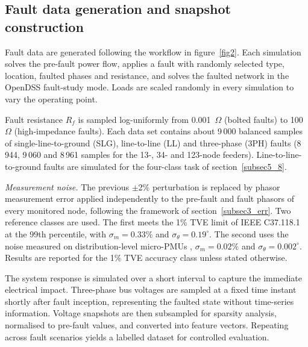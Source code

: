 \documentclass[11pt]{article}
\newenvironment{nw}{}{}
\begin{document}
\subsection{Fault data generation and snapshot construction}\label{subsec2_2}

\begin{nw}
Fault data are generated following the workflow in figure~\ref{fig2}. Each simulation solves the pre-fault power flow, applies a fault with randomly selected type, location, faulted phases and resistance, and solves the faulted network in the OpenDSS fault-study mode. Loads are scaled randomly in every simulation to vary the operating point.

Fault resistance $R_f$ is sampled log-uniformly from 0.001~$\Omega$ (bolted faults) to 100~$\Omega$ (high-impedance faults). Each data set contains about 9\,000 balanced samples of single-line-to-ground (SLG), line-to-line (LL) and three-phase (3PH) faults (8\,944, 9\,060 and 8\,961 samples for the 13-, 34- and 123-node feeders). Line-to-line-to-ground faults are simulated for the four-class task of section~\ref{subsec5_8}.
\end{nw}

\begin{nw}
\textit{Measurement noise.} The previous $\pm$2\% perturbation is replaced by phasor measurement error applied independently to the pre-fault and fault phasors of every monitored node, following the framework of section~\ref{subsec3_err}. Two reference classes are used. The first meets the 1\% TVE limit of IEEE C37.118.1 \cite{ieeec37118} at the 99th percentile, with $\sigma_m=0.33\%$ and $\sigma_\theta=0.19^\circ$. The second uses the noise measured on distribution-level micro-PMUs \cite{upmu}, $\sigma_m=0.02\%$ and $\sigma_\theta=0.002^\circ$. Results are reported for the 1\% TVE accuracy class unless stated otherwise.
\end{nw}

The system response is simulated over a short interval to capture the immediate electrical impact. Three-phase bus voltages are sampled at a fixed time instant shortly after fault inception, representing the faulted state without time-series information. Voltage snapshots are then subsampled for sparsity analysis, normalised to pre-fault values, and converted into feature vectors. Repeating across fault scenarios yields a labelled dataset for controlled evaluation.
\end{document}
